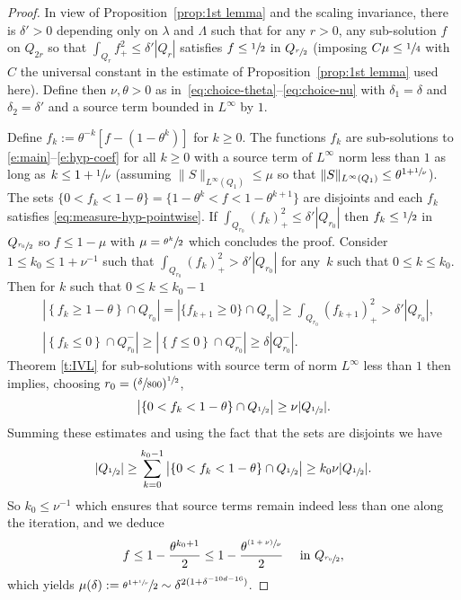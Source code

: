 \documentclass[10pt]{amsart}
\newcommand{\psfrac}[2]{\sfrac{(#1)}{#2}}
\theoremstyle{definition}
\theoremstyle{remark}
\begin{document}
\begin{proof}
In view of Proposition~\ref{prop:1st lemma} and the scaling
invariance, there is $\delta'>0$ depending only on $\lambda$
and $\Lambda$ such that for any $r>0$, any sub-solution $f$ on
$Q_{2r}$ so that $\int_{Q_{r}} f_{+}^2 \leq \delta' |Q_{r}|$
satisfies $f\leq \sfrac{1}{2}$ in $Q_{\sfrac{r}{2}}$ (imposing
$C\mu\le \sfrac{1}{4}$ with $C$ the universal constant in the
estimate of Proposition~\ref{prop:1st lemma} used here). Define
then $\nu, \theta>0$ as
in~\eqref{eq:choice-theta}--\eqref{eq:choice-nu} with
$\delta_1=\delta$ and $\delta_2=\delta'$ and a source term
bounded in $L^\infty$ by $1$.

Define $f_k := \theta^{-k}[f-(1-\theta^k)]$ for $k \ge 0$. The
functions $f_{k}$ are sub-solutions to
\eqref{e:main}--\eqref{e:hyp-coef} for all $k \ge 0$ with a
source term of $L^{\infty}$ norm less than $1$ as long as
$k\leq 1+\sfrac{1}{\nu}$ (assuming
$\| S\|_{L^{\infty}(Q_1)}\le \mu$ so that
$\| S\|_{L^{\infty}(Q_1)} \le \theta^{1+\sfrac{1}{\nu}}$). The
sets $\{ 0<f_{k}<1-\theta\}= \{1-\theta^k<f<1-\theta^{k+1}\}$
are disjoints and each $f_k$ satisfies
\eqref{eq:measure-hyp-pointwise}. If
$\int_{Q_{r_0}} (f_k)_{+}^2 \leq \delta' |Q_{r_0}|$ then
$f_k\leq \sfrac{1}{2}$ in $Q_{\sfrac{r_0}{2}}$ so $f\le 1-\mu$
with $\mu = \sfrac{\theta^k}{2}$ which concludes the proof.
Consider $ 1\leq k_0 \leq 1+\nu^{-1}$ such that
$\int_{Q_{r_0}} (f_{k})_{+}^2 > \delta'|Q_{r_0}|$ for any~$k$ such that $0\leq k\leq k_0$. Then for $k$ such that $0\leq k\leq k_0-1$
\begin{align*}
& \left|\left\{ f_{k}\geq 1-\theta \right\} \cap
Q_{r_0}\right| = \left|\{f_{k+1}\geq
0\} \cap Q_{r_0} \right| \geq \int_{Q_{r_0} } (f_{k+1})_{+}^2
> \delta' |Q_{r_0}|, \\
& \left|\left\{f_{k}\leq 0\right\} \cap Q_{r_0}^{-}\right|
\geq \left|\left\{f\leq 0 \right\}\cap Q_{r_0}^{-}\right|
\geq \delta |Q_{r_0}^-|.
\end{align*}
Theorem \ref{t:IVL} for sub-solutions with source term of norm
$L^{\infty}$ less than $1$ then implies, choosing $r_0 =
(\sfrac{\delta}{800})^{\sfrac12}$,
\[
\left| \left\{ 0<f_{k}< 1-\theta \right\}\cap Q_{\sfrac12}\right|
\geq \nu |Q_{\sfrac12}|.
\]
Summing these estimates and using the fact that the sets are
disjoints we have
\[
|Q_{\sfrac12}|\geq \sum_{k=0}^{k_0-1}
\left| \left\{ 0<f_{k}< 1-\theta \right\}\cap
Q_{\sfrac12} \right| \geq k_0 \nu |Q_{\sfrac12}|.
\]
So $k_0 \leq \nu^{-1}$ which ensures that source terms remain
indeed less than one along the iteration, and we deduce
\begin{align*}
f \leq 1-\frac{\theta^{k_0+1}}{2}\leq
1-\frac{\theta^{\psfrac{1+\nu}{\nu}}}{2} \quad \mbox{ in }
Q_{\sfrac{r_0}{2}},
\end{align*}
which yields
$\mu(\delta) := \sfrac{\theta^{1+\sfrac{1}{\nu}}}{2} \sim
\delta^{2 (1+\delta^{-10d-16})}$.
\end{proof}
\end{document}
